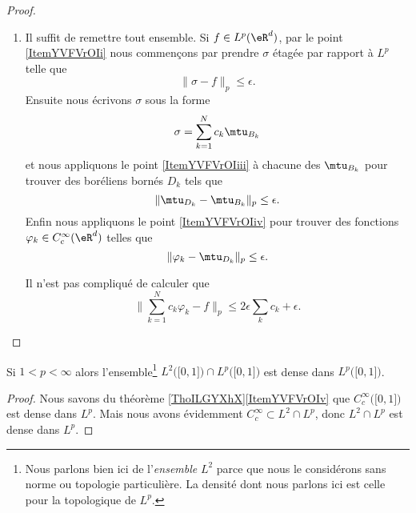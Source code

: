 \begin{proof}
\begin{enumerate}
       \item

           Il suffit de remettre tout ensemble. Si \( f\in L^p(\eR^d)\), par le point \ref{ItemYVFVrOIi} nous commençons par prendre \( \sigma\) étagée par rapport à \( L^p\) telle que
           \begin{equation}
               \| \sigma-f \|_p\leq\epsilon.
           \end{equation}
           Ensuite nous écrivons \( \sigma\) sous la forme
           \begin{equation}
               \sigma=\sum_{k=1}^Nc_k\mtu_{B_k}
           \end{equation}
           et nous appliquons le point \ref{ItemYVFVrOIiii} à chacune des \( \mtu_{B_k}\) pour trouver des boréliens bornés \( D_k\) tels que
           \begin{equation}
               \| \mtu_{D_k}-\mtu_{B_k} \|_p\leq \epsilon.
           \end{equation}
           Enfin nous appliquons le point \ref{ItemYVFVrOIiv} pour trouver des fonctions \( \varphi_k\in C^{\infty}_c(\eR^d)\) telles que
           \begin{equation}
               \| \varphi_k-\mtu_{D_k} \|_p\leq \epsilon.
           \end{equation}

           Il n'est pas compliqué de calculer que
           \begin{equation}
               \big\| \sum_{k=1}^Nc_k\varphi_k-f \big\|_p\leq 2\epsilon\sum_kc_k+\epsilon.
           \end{equation}

   \end{enumerate}
\end{proof}

\begin{corollary}   \label{CorFZWooYNbtPz}
    Si \( 1<p<\infty\) alors l'ensemble\footnote{Nous parlons bien ici de l'\emph{ensemble} \( L^2\) parce que nous le considérons sans norme ou topologie particulière. La densité dont nous parlons ici est celle pour la topologique de \( L^p\).} \( L^2\big( \mathopen[ 0 , 1 \mathclose] \big)\cap L^p\big( \mathopen[ 0 , 1 \mathclose] \big)\) est dense dans \( L^p\big( \mathopen[ 0 , 1 \mathclose] \big)\).
\end{corollary}

\begin{proof}
    Nous savons du théorème \ref{ThoILGYXhX}\ref{ItemYVFVrOIv} que \(  C^{\infty}_c\big( \mathopen[ 0 , 1 \mathclose] \big)\) est dense dans \( L^p\). Mais nous avons évidemment \(  C^{\infty}_c\subset L^2\cap L^p\), donc \( L^2\cap L^p\) est dense dans \( L^p\).
\end{proof}

